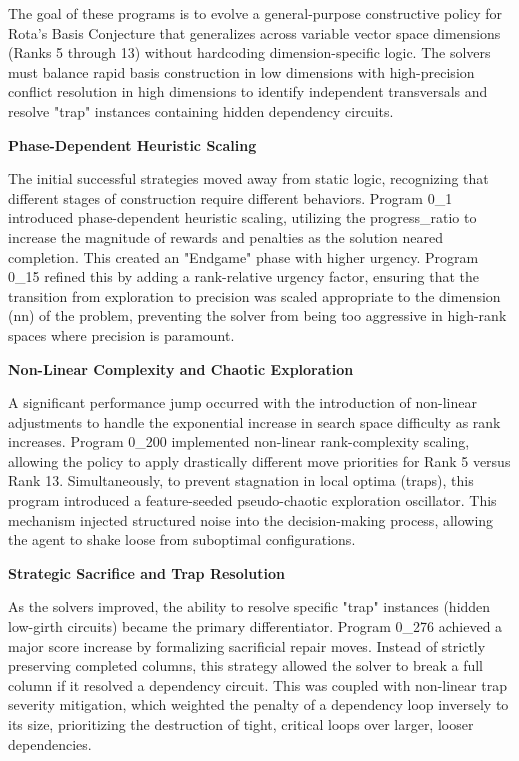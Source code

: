 \documentclass[11pt]{amsart}
\begin{document}
\begin{tcolorbox}[
  enhanced,
  breakable,
  title={Gemini-generated summary},
  colback=gray!3,
  colframe=black!30,
  title after break={Gemini-generated summary (continued)}
]
The goal of these programs is to evolve a general-purpose constructive policy for Rota's Basis Conjecture that generalizes across variable vector space dimensions (Ranks 5 through 13) without hardcoding dimension-specific logic. The solvers must balance rapid basis construction in low dimensions with high-precision conflict resolution in high dimensions to identify independent transversals and resolve "trap" instances containing hidden dependency circuits.

\noindent \textbf{Phase-Dependent Heuristic Scaling}

The initial successful strategies moved away from static logic, recognizing that different stages of construction require different behaviors. Program 0\_1 introduced phase-dependent heuristic scaling, utilizing the progress\_ratio to increase the magnitude of rewards and penalties as the solution neared completion. This created an "Endgame" phase with higher urgency. Program 0\_15 refined this by adding a rank-relative urgency factor, ensuring that the transition from exploration to precision was scaled appropriate to the dimension (nn) of the problem, preventing the solver from being too aggressive in high-rank spaces where precision is paramount.

\noindent \textbf{Non-Linear Complexity and Chaotic Exploration}

A significant performance jump occurred with the introduction of non-linear adjustments to handle the exponential increase in search space difficulty as rank increases. Program 0\_200 implemented non-linear rank-complexity scaling, allowing the policy to apply drastically different move priorities for Rank 5 versus Rank 13. Simultaneously, to prevent stagnation in local optima (traps), this program introduced a feature-seeded pseudo-chaotic exploration oscillator. This mechanism injected structured noise into the decision-making process, allowing the agent to shake loose from suboptimal configurations.

\noindent \textbf{Strategic Sacrifice and Trap Resolution}

As the solvers improved, the ability to resolve specific "trap" instances (hidden low-girth circuits) became the primary differentiator. Program 0\_276 achieved a major score increase by formalizing sacrificial repair moves. Instead of strictly preserving completed columns, this strategy allowed the solver to break a full column if it resolved a dependency circuit. This was coupled with non-linear trap severity mitigation, which weighted the penalty of a dependency loop inversely to its size, prioritizing the destruction of tight, critical loops over larger, looser dependencies.


\end{tcolorbox}
\end{document}
